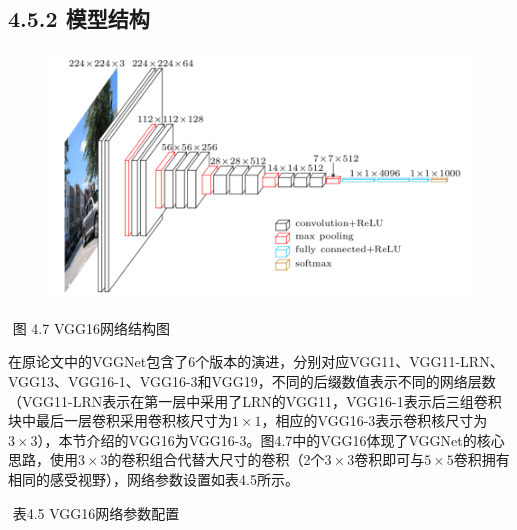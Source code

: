 \subsection{4.5.2 模型结构}\label{ux6a21ux578bux7ed3ux6784-4}

\begin{figure}
\centering
\includegraphics{./img/ch4/vgg16.png}
\caption{}
\end{figure}

​ 图 4.7 VGG16网络结构图

​
在原论文中的VGGNet包含了6个版本的演进，分别对应VGG11、VGG11-LRN、VGG13、VGG16-1、VGG16-3和VGG19，不同的后缀数值表示不同的网络层数（VGG11-LRN表示在第一层中采用了LRN的VGG11，VGG16-1表示后三组卷积块中最后一层卷积采用卷积核尺寸为\(1\times1\)，相应的VGG16-3表示卷积核尺寸为\(3\times3\)），本节介绍的VGG16为VGG16-3。图4.7中的VGG16体现了VGGNet的核心思路，使用\(3\times3\)的卷积组合代替大尺寸的卷积（2个\(3\times3卷积即可与\)\(5\times5\)卷积拥有相同的感受视野），网络参数设置如表4.5所示。

​ 表4.5 VGG16网络参数配置

